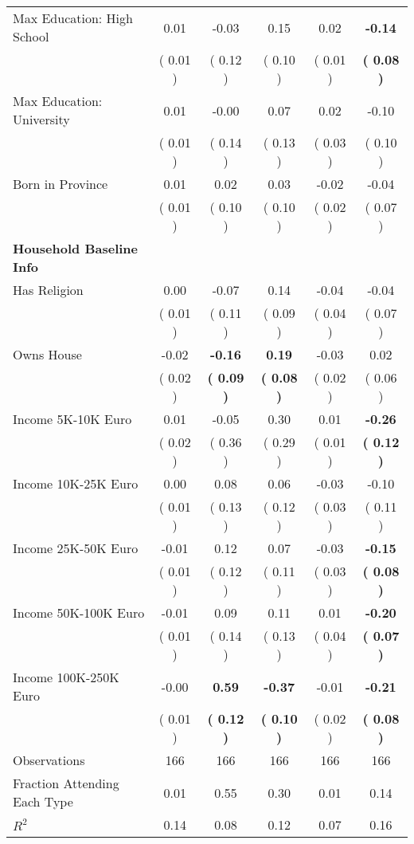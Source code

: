 \begin{table}[H]
{\begin{tabular}{lccccc}
\quad Max Education: High School &      0.01 &     -0.03 &      0.15 &      0.02 & \textbf{    -0.14} \\
\quad  & (     0.01 ) & (     0.12 )  & (     0.10 )  & (     0.01 ) & \textbf{(     0.08 )} \\
\quad Max Education: University &      0.01 &     -0.00 &      0.07 &      0.02 &     -0.10 \\
\quad  & (     0.01 ) & (     0.14 )  & (     0.13 )  & (     0.03 ) & (     0.10 ) \\
\quad Born in Province &      0.01 &      0.02 &      0.03 &     -0.02 &     -0.04 \\
\quad  & (     0.01 ) & (     0.10 )  & (     0.10 )  & (     0.02 ) & (     0.07 ) \\
\midrule
\textbf{Household Baseline Info} \\
\quad Has Religion &      0.00 &     -0.07 &      0.14 &     -0.04 &     -0.04 \\
\quad  & (     0.01 ) & (     0.11 )  & (     0.09 )  & (     0.04 ) & (     0.07 ) \\
\quad Owns House &     -0.02 & \textbf{    -0.16} & \textbf{     0.19} &     -0.03 &      0.02 \\
\quad  & (     0.02 ) & \textbf{(     0.09 )}  & \textbf{(     0.08 )}  & (     0.02 ) & (     0.06 ) \\
\quad Income 5K-10K Euro &      0.01 &     -0.05 &      0.30 &      0.01 & \textbf{    -0.26} \\
\quad  & (     0.02 ) & (     0.36 )  & (     0.29 )  & (     0.01 ) & \textbf{(     0.12 )} \\
\quad Income 10K-25K Euro &      0.00 &      0.08 &      0.06 &     -0.03 &     -0.10 \\
\quad  & (     0.01 ) & (     0.13 )  & (     0.12 )  & (     0.03 ) & (     0.11 ) \\
\quad Income 25K-50K Euro &     -0.01 &      0.12 &      0.07 &     -0.03 & \textbf{    -0.15} \\
\quad  & (     0.01 ) & (     0.12 )  & (     0.11 )  & (     0.03 ) & \textbf{(     0.08 )} \\
\quad Income 50K-100K Euro &     -0.01 &      0.09 &      0.11 &      0.01 & \textbf{    -0.20} \\
\quad  & (     0.01 ) & (     0.14 )  & (     0.13 )  & (     0.04 ) & \textbf{(     0.07 )} \\
\quad Income 100K-250K Euro &     -0.00 & \textbf{     0.59} & \textbf{    -0.37} &     -0.01 & \textbf{    -0.21} \\
\quad  & (     0.01 ) & \textbf{(     0.12 )}  & \textbf{(     0.10 )}  & (     0.02 ) & \textbf{(     0.08 )} \\
\midrule
Observations & 166 & 166 & 166 & 166 & 166 \\
Fraction Attending Each Type &      0.01 &      0.55 &      0.30 &      0.01 &      0.14 \\
\midrule
$ R^2$ &      0.14 &      0.08 &      0.12 &      0.07 &      0.16 \\
\bottomrule
\end{tabular}}
\end{table}
